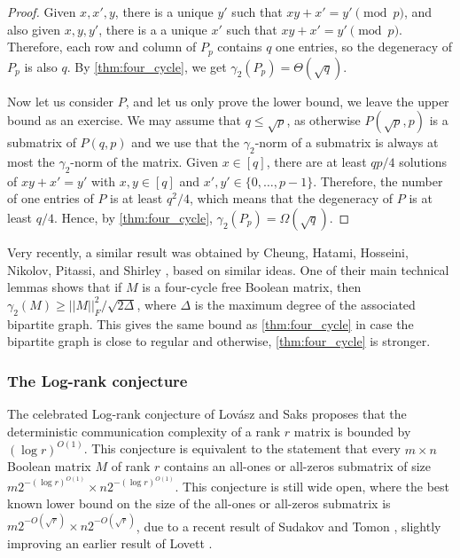 \documentclass[11pt]{amsart}
\theoremstyle{plain}
\theoremstyle{definition}
\begin{document}
\begin{proof}
 Given $x,x',y$, there is a unique $y'$ such that $xy+x'=y' \pmod{p}$, and also given $x,y,y'$, there is a a unique $x'$ such that $xy+x'=y' \pmod{p}$. Therefore, each row and column of $P_p$ contains $q$ one entries, so the degeneracy of $P_p$ is also $q$. By \cref{thm:four_cycle}, we get $\gamma_2(P_p)=\Theta(\sqrt{q})$.

Now let us consider $P$, and let us only prove the lower bound, we leave the upper bound as an exercise. We may assume that $q\leq \sqrt{p}$, as otherwise $P(\sqrt{p},p)$ is a submatrix of $P(q,p)$ and we use that the $\gamma_2$-norm of a submatrix is always at most the $\gamma_2$-norm of the matrix. Given $x\in [q]$, there are at least $qp/4$ solutions of $xy+x'=y'$ with $x,y\in [q]$ and $x',y'\in \{0,\dots,p-1\}$. Therefore, the number of one entries of $P$ is at least $q^2/4$, which means that the degeneracy of $P$ is at least $q/4$. Hence, by \cref{thm:four_cycle}, $\gamma_2(P_p)=\Omega(\sqrt{q})$. 
\end{proof}

Very recently, a similar result was obtained by Cheung, Hatami, Hosseini, Nikolov, Pitassi, and Shirley \cite{CHHNPS}, based on similar ideas. One of their main technical lemmas shows that if $M$ is a four-cycle free Boolean matrix, then $\gamma_2(M)\geq ||M||_F^2/\sqrt{2\Delta}$, where $\Delta$ is the maximum degree of the associated bipartite graph. This gives the same bound as \cref{thm:four_cycle} in case the bipartite graph is close to regular and otherwise, \cref{thm:four_cycle} is stronger. %

\subsubsection{The Log-rank conjecture} The celebrated Log-rank conjecture of Lov\'asz and Saks \cite{logrank} proposes that the deterministic communication complexity of a rank $r$ matrix is bounded by $(\log r)^{O(1)}$. This conjecture is equivalent to the statement that every $m\times n$ Boolean matrix $M$ of rank $r$ contains an all-ones or all-zeros submatrix of size $m2^{-(\log r)^{O(1)}}\times n2^{-(\log r)^{O(1)}}$. This conjecture is still wide open, where the best known lower bound on the size of the all-ones or all-zeros submatrix is $m2^{-O(\sqrt{r})}\times n2^{-O(\sqrt{r})}$, due to a recent result of Sudakov and Tomon \cite{ST24}, slightly improving an earlier result of Lovett \cite{L16}. 
\end{document}
